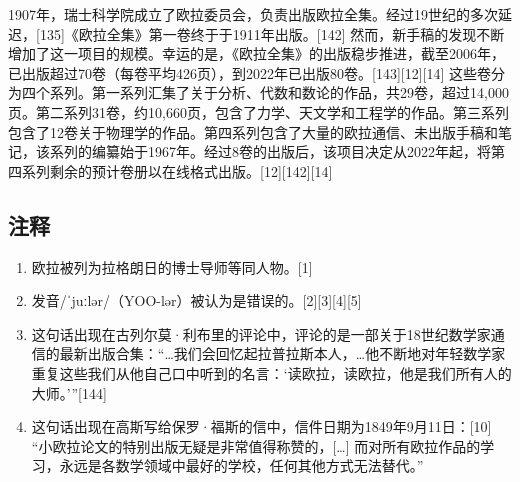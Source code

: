 1907年，瑞士科学院成立了欧拉委员会，负责出版欧拉全集。经过19世纪的多次延迟，[135]《欧拉全集》第一卷终于于1911年出版。[142] 然而，新手稿的发现不断增加了这一项目的规模。幸运的是，《欧拉全集》的出版稳步推进，截至2006年，已出版超过70卷（每卷平均426页），到2022年已出版80卷。[143][12][14] 这些卷分为四个系列。第一系列汇集了关于分析、代数和数论的作品，共29卷，超过14,000页。第二系列31卷，约10,660页，包含了力学、天文学和工程学的作品。第三系列包含了12卷关于物理学的作品。第四系列包含了大量的欧拉通信、未出版手稿和笔记，该系列的编纂始于1967年。经过8卷的出版后，该项目决定从2022年起，将第四系列剩余的预计卷册以在线格式出版。[12][142][14]
\subsection{注释}
\begin{enumerate}
\item 欧拉被列为拉格朗日的博士导师等同人物。[1]
\item 发音/ˈjuːlər/（YOO-lər）被认为是错误的。[2][3][4][5]
\item 这句话出现在古列尔莫·利布里的评论中，评论的是一部关于18世纪数学家通信的最新出版合集：“…我们会回忆起拉普拉斯本人，…他不断地对年轻数学家重复这些我们从他自己口中听到的名言：‘读欧拉，读欧拉，他是我们所有人的大师。’”[144]
\item 这句话出现在高斯写给保罗·福斯的信中，信件日期为1849年9月11日：[10] “小欧拉论文的特别出版无疑是非常值得称赞的，[…] 而对所有欧拉作品的学习，永远是各数学领域中最好的学校，任何其他方式无法替代。”
\end{enumerate}
